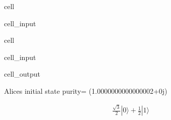 \documentclass[letterpaper,10pt,english]{jupyterBook}
\begin{document}
\begin{sphinxuseclass}{cell}\begin{sphinxVerbatimInput}

\begin{sphinxuseclass}{cell_input}
\begin{sphinxVerbatim}[commandchars=\\\{\}]
  
\end{sphinxVerbatim}

\end{sphinxuseclass}\end{sphinxVerbatimInput}

\end{sphinxuseclass}
\begin{sphinxuseclass}{cell}\begin{sphinxVerbatimInput}

\begin{sphinxuseclass}{cell_input}
\begin{sphinxVerbatim}[commandchars=\\\{\}]
   \PYG{p}{[}\PYG{p}{]}
  
\end{sphinxVerbatim}

\end{sphinxuseclass}\end{sphinxVerbatimInput}
\begin{sphinxVerbatimOutput}

\begin{sphinxuseclass}{cell_output}
\begin{sphinxVerbatim}[commandchars=\\\{\}]
Alice\PYGZsq{}s initial state
purity= (1.0000000000000002+0j)
\end{sphinxVerbatim}
\begin{equation*}
\begin{split}\frac{\sqrt{3}}{2} |0\rangle+\frac{1}{2} |1\rangle\end{split}
\end{equation*}
\end{sphinxuseclass}\end{sphinxVerbatimOutput}

\end{sphinxuseclass}
\end{document}
